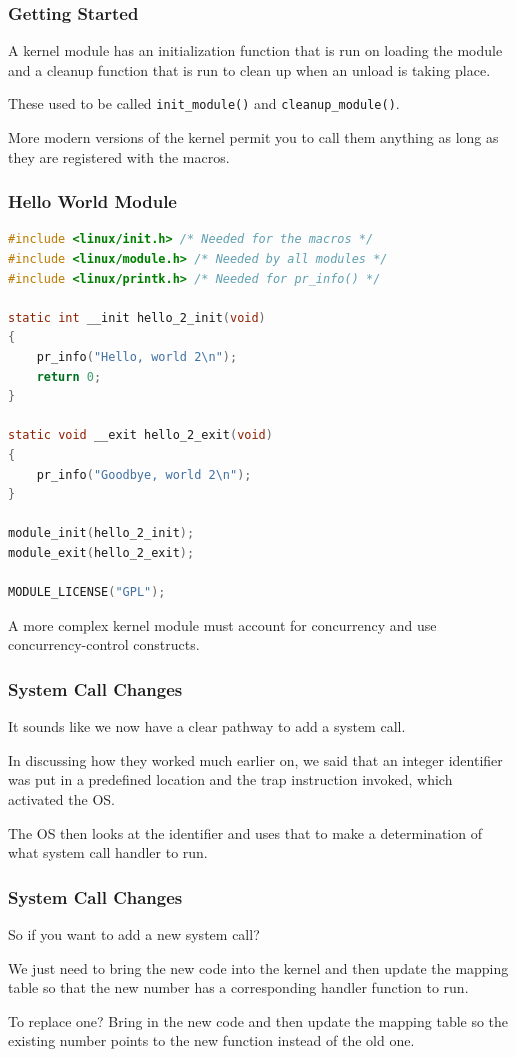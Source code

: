 \begin{frame}
\frametitle{Getting Started}

A kernel module has an initialization function that is run on loading the module and a cleanup function that is run to clean up when an unload is taking place.

These used to be called \texttt{init\_module()} and \texttt{cleanup\_module()}.

More modern versions of the kernel permit you to call them anything as long as they are registered with the macros.
\end{frame}


\begin{frame}[fragile]
\frametitle{Hello World Module}

\begin{lstlisting}[language=C]
#include <linux/init.h> /* Needed for the macros */
#include <linux/module.h> /* Needed by all modules */
#include <linux/printk.h> /* Needed for pr_info() */

static int __init hello_2_init(void)
{
    pr_info("Hello, world 2\n");
    return 0;
}

static void __exit hello_2_exit(void)
{
    pr_info("Goodbye, world 2\n");
}

module_init(hello_2_init);
module_exit(hello_2_exit);

MODULE_LICENSE("GPL");
\end{lstlisting}

A more complex kernel module must account for concurrency and use concurrency-control constructs.

\end{frame}


\begin{frame}
\frametitle{System Call Changes}

It sounds like we now have a clear pathway to add a system call. 

In discussing how they worked much earlier on, we said that an integer identifier was put in a predefined location and the trap instruction invoked, which activated the OS. 

The OS then looks at the identifier and uses that to make a determination of what system call handler to run. 

\end{frame}

\begin{frame}
\frametitle{System Call Changes}

So if you want to add a new system call? 

We just need to bring the new code into the kernel and then update the mapping table so that the new number has a corresponding handler function to run. 

To replace one? Bring in the new code and then update the mapping table so the existing number points to the new function instead of the old one.

\end{frame}



